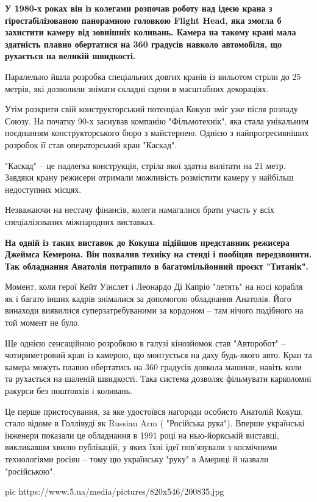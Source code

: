 {\bfseries
У 1980-х роках він із колегами розпочав роботу над ідеєю крана з
гіростабілізованою панорамною головкою Flight Head, яка змогла б
захистити камеру від зовнішніх коливань. Камера на такому крані мала
здатність плавно обертатися на 360 градусів навколо автомобіля, що
рухається на великій швидкості.
}

Паралельно йшла розробка спеціальних довгих кранів із вильотом стріли до
25 метрів, які дозволили знімати складні сцени в масштабних декораціях.

Утім розкрити свій конструкторський потенціал Кокуш зміг уже після розпаду
Союзу. На початку 90-х заснував компанію "Фільмотехнік", яка стала
унікальним поєднанням конструкторського бюро з майстернею. Однією з
найпрогресивніших розробок її став операторський кран "Каскад".

"Каскад" – це надлегка конструкція, стріла якої здатна вилітати на 21
метр. Завдяки крану режисери отримали можливість розмістити камеру у
найбільш недоступних місцях.

Незважаючи на нестачу фінансів, колеги намагалися брати участь у всіх
спеціалізованих міжнародних виставках.

{\bfseries
На одній із таких виставок до Кокуша підійшов представник режисера
Джеймса Кемерона. Він похвалив техніку на стенді і пообіцяв
передзвонити. Так обладнання Анатолія потрапило в багатомільйонний
проєкт "Титанік".
}

Момент, коли герої Кейт Уінслет і Леонардо Ді Капріо "летять" на носі
корабля як і багато інших кадрів знімалися за допомогою обладнання
Анатолія. Його винаходи виявилися суперзатребуваними за кордоном – там
нічого подібного на той момент не було.

Ще однією сенсаційною розробкою в галузі кінозйомок став "Авторобот" –
чотириметровий кран із камерою, що монтується на даху будь-якого авто.
Кран та камера можуть плавно обертатись на 360 градусів довкола машини,
навіть коли та рухається на шаленій швидкості. Така система дозволяє
фільмувати карколомні ракурси без поштовхів і коливань.

Це перше пристосування, за яке удостоївся нагороди особисто Анатолій
Кокуш, стало відоме в Голлівуді як Russian Arm ( "Російська рука"). Вперше
українські інженери показали це обладнання в 1991 році на нью-йоркській
виставці, викликавши хвилю публікацій, у яких їхні ідеї пов'язували з
космічними технологіями росіян – тому цю українську "руку" в Америці й
назвали "російською". 

\ifcmt
pic https://www.5.ua/media/pictures/820x546/200835.jpg
\fi

